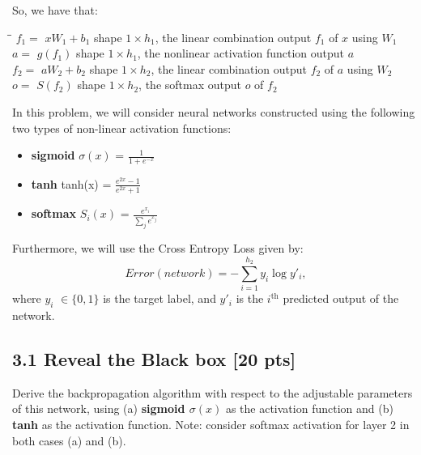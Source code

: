 \pagebreak

So, we have that:
\begin{tabbing}
\hspace*{2cm}\=\hspace*{3cm}\= \kill
 \hspace*{10mm} $f_1 =$ \> $xW_1+b_1$ \> shape $1 \times h_1$, the linear combination output $f_1$ of $x$ using $W_1$\\
 \hspace*{10mm} $a =$ \> $g(f_1)$ \> shape $1 \times h_1$, the nonlinear activation function output $a$\\
 \hspace*{10mm} $f_2 =$ \> $aW_2+b_2$ \> shape $1 \times h_2$, the linear combination output $f_2$ of $a$ using $W_2$\\
 \hspace*{10mm} $o =$ \> $S(f_2)$ \> shape $1 \times h_2$, the softmax output $o$ of $f_2$\\
\end{tabbing}

In this problem, we will consider neural networks constructed using the following two types of non-linear activation functions: 
\begin{itemize}
\item \textbf{sigmoid} $\sigma(x)$ = $\frac{1}{1 + e ^{-x}}$
\item \textbf{tanh} tanh(x) = $\frac{e^{2x}-1}{e^{2x}+1}$
\item \textbf{softmax} $S_i(x)$ = $\frac{e^{x_i}}{\sum_j{e^{x_j}}}$
\end{itemize}

\hfill \linebreak
Furthermore, we will use the Cross Entropy Loss given by:
\begin{equation*}
	Error(network) = -\sum_{i = 1}^{ {h_2}} y_i\log y'_i,
\end{equation*}
where $y_i$ $\in\{0,1\}$ is the target label, and $y'_i$ is the $i^{\text{th}}$ predicted output of the network.
\newline\newline

\subsection*{3.1 Reveal the Black box [20 pts]}
Derive the backpropagation algorithm with respect to the adjustable parameters of this network, using (a) \textbf{sigmoid $\sigma(x)$} as the activation function and (b) \textbf{tanh} as the activation function. Note: consider softmax activation for layer 2 in both cases (a) and (b). 

